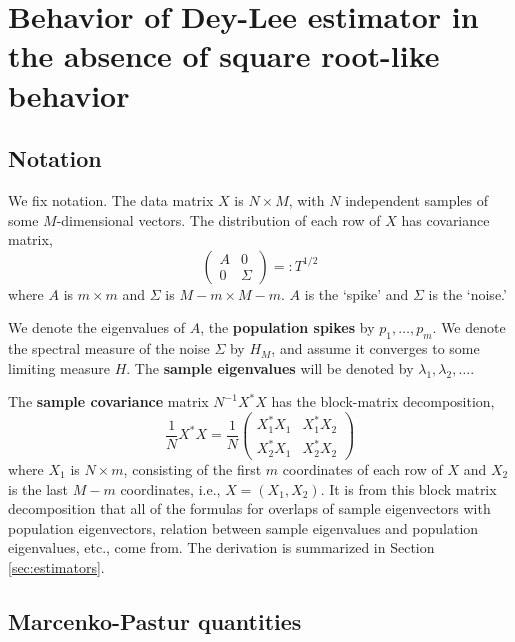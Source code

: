 \documentclass[11 pt, reqno]{article}
\def\beq{\begin{equation}}
\def\eeq{\end{equation}}
\begin{document}
\section{Behavior of Dey-Lee estimator in the absence of square root-like behavior}
\subsection{Notation} 
We fix notation.  The data matrix $X$ is $N \times M$, with $N$ independent samples of some $M$-dimensional vectors.  The distribution of each row of $X$ has covariance matrix,
\beq
\left( \begin{matrix} A & 0 \\ 0 & \Sigma \end{matrix} \right) =: T^{1/2}
\eeq
where $A$ is $m \times m$ and $\Sigma$ is $M-m \times M-m$.  $A$ is the `spike' and $\Sigma$ is the `noise.'  

We denote the eigenvalues of $A$, the {\bf population spikes} by $p_1, \dots, p_m$.  We denote the spectral measure of the noise $\Sigma$ by $H_M$, and assume it converges to some limiting measure $H$.   The {\bf sample eigenvalues} will be denoted by $\lambda_1, \lambda_2, \dots$.

The {\bf sample covariance} matrix $N^{-1} X^* X$ has the block-matrix decomposition,
\beq
\frac{1}{N} X^* X = \frac{1}{N} \left( \begin{matrix} X_1^* X_1 & X_1^* X_2 \\ X_2^* X_1 & X_2^* X_2 \end{matrix}\right)
\eeq
where $X_1$ is $N \times m$, consisting of the first $m$ coordinates of each row of $X$ and $X_2$ is the last $M-m$ coordinates, i.e., $X = ( X_1,  X_2 )$.  It is from this block matrix decomposition that all of the formulas for overlaps of sample eigenvectors with population eigenvectors, relation between sample eigenvalues and population eigenvalues, etc., come from.  The derivation is summarized in Section \ref{sec:estimators}. 
\subsection{Marcenko-Pastur quantities}
\end{document}
